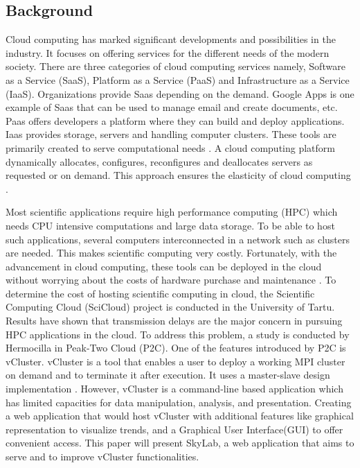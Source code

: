 \documentclass[journal]{./IEEE/IEEEtran}
\begin{document}
	\subsection{Background}
	Cloud computing has marked significant developments and possibilities in the industry. It focuses on offering services for the different needs of the modern society. There are three categories of cloud computing services namely, Software as a Service (SaaS), Platform as a Service (PaaS) and Infrastructure as a Service (IaaS). Organizations provide Saas depending on the demand. Google Apps is one example of Saas that can be used to manage email and create documents, etc. Paas offers developers a platform where they can build and deploy applications. Iaas provides storage, servers and handling computer clusters. These tools are primarily created to serve computational needs \cite {Ahuja2012}. A cloud computing platform dynamically allocates, configures, reconfigures and deallocates servers as requested or on demand. This approach ensures the elasticity of cloud computing \cite {Brandic2011}.

	Most scientific applications require high performance computing (HPC) which needs CPU intensive computations and large data storage. To be able to host such applications, several computers interconnected in a network such as clusters are needed. This makes scientific computing very costly. Fortunately, with the advancement in cloud computing, these tools can be deployed in the cloud without worrying about the costs of hardware purchase and maintenance \cite {Ahuja2012}. To determine the cost of hosting scientific computing in cloud, the Scientific Computing Cloud (SciCloud) project is conducted in the University of Tartu. Results have shown that transmission delays are the major concern in pursuing HPC applications in the cloud\cite {Brandic2011}.  To address this problem, a study is conducted by Hermocilla in Peak-Two Cloud (P2C). One of the features introduced by P2C is vCluster. vCluster is a tool that enables a user to deploy a working MPI cluster on demand and to terminate it after execution. It uses a master-slave design implementation \cite {Hermocilla2014}. However, vCluster is a command-line based application which has limited capacities for data manipulation, analysis, and presentation. Creating a web application that would host vCluster with additional features like graphical representation to visualize trends, and a Graphical User Interface(GUI) to offer convenient access. This paper will present SkyLab, a web application that aims to serve and to improve vCluster functionalities.
\end{document}
